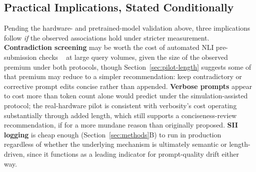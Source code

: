 \documentclass[conference]{IEEEtran}
\begin{document}
\subsection{Practical Implications, Stated Conditionally}
Pending the hardware- and pretrained-model validation above, three
implications follow \emph{if} the observed associations hold under
stricter measurement. \textbf{Contradiction screening} may be worth
the cost of automated NLI pre-submission checks
~\cite{farquhar2024detecting} at large query volumes, given the size
of the observed premium under both protocols, though
Section~\ref{sec:pilot-length} suggests some of that premium may
reduce to a simpler recommendation: keep contradictory or corrective
prompt edits concise rather than appended. \textbf{Verbose prompts}
appear to cost more than token count alone would predict under the
simulation-assisted protocol; the real-hardware pilot is consistent
with verbosity's cost operating substantially through added length,
which still supports a conciseness-review recommendation, if for a
more mundane reason than originally proposed. \textbf{SII logging} is
cheap enough (Section~\ref{sec:methods}B) to run in production
regardless of whether the underlying mechanism is ultimately
semantic or length-driven, since it functions as a leading indicator
for prompt-quality drift either way.
\end{document}
